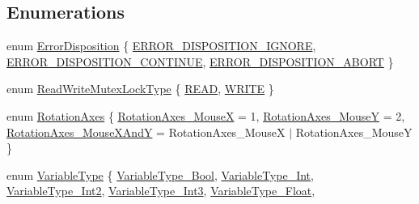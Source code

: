 \subsection*{Enumerations}
\begin{DoxyCompactItemize}
\item 
enum \hyperlink{namespacemage_a7146b3c3db53179eeb32bf4d51934715}{Error\+Disposition} \{ \hyperlink{namespacemage_a7146b3c3db53179eeb32bf4d51934715a4e2fb15c20db8e908d57e1aca6f4c04b}{E\+R\+R\+O\+R\+\_\+\+D\+I\+S\+P\+O\+S\+I\+T\+I\+O\+N\+\_\+\+I\+G\+N\+O\+RE}, 
\hyperlink{namespacemage_a7146b3c3db53179eeb32bf4d51934715aed8dd8c3d30ca6bdddb75fb2e52560b6}{E\+R\+R\+O\+R\+\_\+\+D\+I\+S\+P\+O\+S\+I\+T\+I\+O\+N\+\_\+\+C\+O\+N\+T\+I\+N\+UE}, 
\hyperlink{namespacemage_a7146b3c3db53179eeb32bf4d51934715a9b39ef50a35cd069416b347c28825cef}{E\+R\+R\+O\+R\+\_\+\+D\+I\+S\+P\+O\+S\+I\+T\+I\+O\+N\+\_\+\+A\+B\+O\+RT}
 \}
\item 
enum \hyperlink{namespacemage_afd76fcca37ce5c5b2227671290973c74}{Read\+Write\+Mutex\+Lock\+Type} \{ \hyperlink{namespacemage_afd76fcca37ce5c5b2227671290973c74a384918b13691984406aeb754f1c454d0}{R\+E\+AD}, 
\hyperlink{namespacemage_afd76fcca37ce5c5b2227671290973c74aff9d196f4bda4079f3f1ce90bd644662}{W\+R\+I\+TE}
 \}
\item 
enum \hyperlink{namespacemage_a548e5c31b08a1078841ed21948f5bf4c}{Rotation\+Axes} \{ \hyperlink{namespacemage_a548e5c31b08a1078841ed21948f5bf4ca4b43faee47620c82f4223a55d7de4ddb}{Rotation\+Axes\+\_\+\+MouseX} = 1, 
\hyperlink{namespacemage_a548e5c31b08a1078841ed21948f5bf4ca0c20aa8d3a6ad2edf788cfb45cc950e1}{Rotation\+Axes\+\_\+\+MouseY} = 2, 
\hyperlink{namespacemage_a548e5c31b08a1078841ed21948f5bf4ca6b0dd5cb81f83efb4c2b36456d84750d}{Rotation\+Axes\+\_\+\+Mouse\+X\+AndY} = Rotation\+Axes\+\_\+\+MouseX $\vert$ Rotation\+Axes\+\_\+\+MouseY
 \}
\item 
enum \hyperlink{namespacemage_a530428e73bac0ba7fe84b29086a9e33a}{Variable\+Type} \{ \newline
\hyperlink{namespacemage_a530428e73bac0ba7fe84b29086a9e33aa3e931f5acb84d36faafd4e2a9a927413}{Variable\+Type\+\_\+\+Bool}, 
\hyperlink{namespacemage_a530428e73bac0ba7fe84b29086a9e33aae0b6cd2e0baf9fe25bdad167df6839fe}{Variable\+Type\+\_\+\+Int}, 
\hyperlink{namespacemage_a530428e73bac0ba7fe84b29086a9e33aacc3025667a8103a37ec86e3d953f27e9}{Variable\+Type\+\_\+\+Int2}, 
\hyperlink{namespacemage_a530428e73bac0ba7fe84b29086a9e33aaf09835cc5d74cc33e0949bee9899ba3e}{Variable\+Type\+\_\+\+Int3}, 
\newline
\hyperlink{namespacemage_a530428e73bac0ba7fe84b29086a9e33aa0aed618ec60afb1acfa4fd4e8ce518d9}{Variable\+Type\+\_\+\+Float}, 

\end{DoxyCompactItemize}
